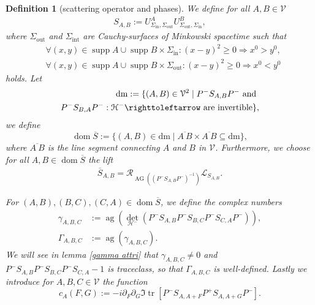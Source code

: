 \documentclass[b5paper,draft,openbib,12pt]{memoir}
\newtheorem{Def}{Definition}
\DeclareMathOperator*{\supp}{supp}
\DeclareMathOperator{\tr}{tr}
\DeclareMathOperator{\ag}{ag}
\DeclareMathOperator{\AG}{AG}
\DeclareMathOperator{\dom}{dom}
\begin{document}
\begin{Def}[scattering operator and phases]\label{def: S bar, gamma, cA}
We define for all \(A,B\in\mathcal{V} \)
\begin{align}
S_{A,B}:=U^{A}_{\Sigma_{\mathrm{in}},\Sigma_{\mathrm{out}}}U^{B}_{\Sigma_{\mathrm{out}},\Sigma_{\mathrm{in}}},
\end{align}
where \(\Sigma_{\mathrm{out}}\) and \(\Sigma_{\mathrm{int}}\)  are Cauchy-surfaces of Minkowski spacetime such that 
\begin{align}
&\forall (x,y)\in \supp A\cup\supp B\times \Sigma_{\mathrm{in}}: (x-y)^2 \ge 0\Rightarrow x^0>y^0,\\
&\forall (x,y)\in \supp A\cup\supp B\times \Sigma_{\mathrm{out}}: (x-y)^2 \ge 0\Rightarrow x^0<y^0
\end{align}
holds.
Let 
\begin{align}
\mathrm{dm}:=\{(A,B)\in\mathcal{V}^2\mid P^- S_{A,B}P^-\text{ and }\\
 P^- S_{B,A}P^-:\mathcal{H}^- \righttoleftarrow  \text{ are invertible}\},
\end{align}
we define
\begin{equation}\label{dom s bar}
\dom\overline{S}:=\{(A,B)\in \mathrm{dm}\mid  \overline{A~B}\times\overline{A~B} \subseteq \mathrm{dm} \},
\end{equation}
where \(\overline{A~B}\) is the line segment connecting \(A\) and \(B\) in \(\mathcal{V}\).
Furthermore, we choose for all \(A,B\in \dom \overline{S}\) the lift
\begin{align}
\overline{S}_{A,B}=\mathcal{R}_{\AG((P^- S_{A,B}P^-)^{-1})} \mathcal{L}_{S_{A,B}}.
\end{align}

For \((A,B),(B,C), (C,A)\in\dom\overline{S}\), we define 
 the complex numbers 
\begin{align}\label{def: gamma}
\gamma_{A,B,C}&:=\ag(\det_{\mathcal{H}^-} (P^- S_{A,B} P^- S_{B,C} P^- S_{C,A}P^-)),\\
\Gamma_{A,B,C}&:=\ag(\gamma_{A,B,C}).
\end{align}
We will see in lemma \ref{gamma attri} that 
\(\gamma_{A,B,C}\neq 0\) and
\( P^-S_{A,B}P^-S_{B,C}P^-S_{C,A}-1\) is traceclass, so 
that \(\Gamma_{A,B,C}\) is well-defined.
Lastly we introduce for \(A,B,C\in\mathcal{V}\) the function
\begin{equation}
c_A(F,G):=-i \partial_F \partial_G  \Im \tr [P^- S_{A,A+F} P^+ S_{A,A+G} P^-] .
\end{equation}
\end{Def}
\end{document}
